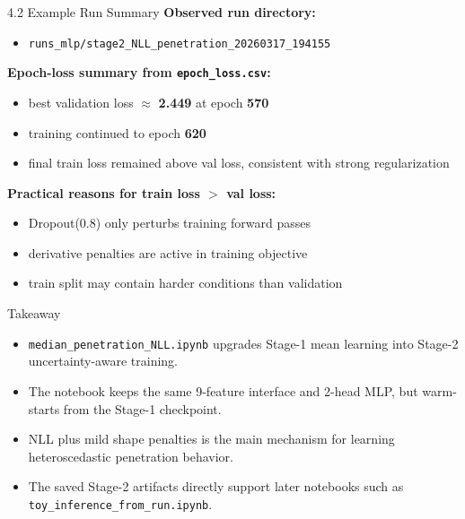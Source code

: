 \documentclass[UTF8,aspectratio=169]{ctexbeamer}
\begin{document}
\begin{frame}{4.2 Example Run Summary}
\textbf{Observed run directory:}
\begin{itemize}
  \item \texttt{runs\_mlp/stage2\_NLL\_penetration\_20260317\_194155}
\end{itemize}

\vspace{0.3em}
\textbf{Epoch-loss summary from \texttt{epoch\_loss.csv}:}
\begin{itemize}
  \item best validation loss $\approx$ \textbf{2.449} at epoch \textbf{570}
  \item training continued to epoch \textbf{620}
  \item final train loss remained above val loss, consistent with strong regularization
\end{itemize}

\vspace{0.3em}
\textbf{Practical reasons for train loss $>$ val loss:}
\begin{itemize}
  \item Dropout(0.8) only perturbs training forward passes
  \item derivative penalties are active in training objective
  \item train split may contain harder conditions than validation
\end{itemize}
\end{frame}

\begin{frame}{Takeaway}
\begin{itemize}
  \item \texttt{median\_penetration\_NLL.ipynb} upgrades Stage-1 mean learning into Stage-2 uncertainty-aware training.
  \item The notebook keeps the same 9-feature interface and 2-head MLP, but warm-starts from the Stage-1 checkpoint.
  \item NLL plus mild shape penalties is the main mechanism for learning heteroscedastic penetration behavior.
  \item The saved Stage-2 artifacts directly support later notebooks such as \texttt{toy\_inference\_from\_run.ipynb}.
\end{itemize}
\end{frame}
\end{document}
